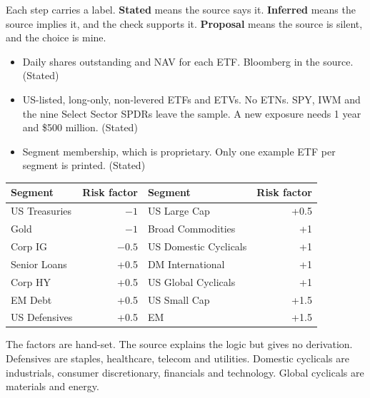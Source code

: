 \documentclass[11pt,a4paper]{article}
\newcommand{\sublabel}[1]{\par\vspace{3pt}\needspace{3\baselineskip}{\sffamily\small\bfseries #1}\par\nopagebreak[4]\vspace{1pt}}
\begin{document}
Each step carries a label. \textbf{Stated} means the source says it. \textbf{Inferred} means the source implies it, and the check supports it. \textbf{Proposal} means the source is silent, and the choice is mine.

\sublabel{Inputs}
\begin{itemize}
\item Daily shares outstanding and NAV for each ETF. Bloomberg in the source. (Stated)
\item US-listed, long-only, non-levered ETFs and ETVs. No ETNs. SPY, IWM and the nine Select Sector SPDRs leave the sample. A new exposure needs 1 year and \$500 million. (Stated)
\item Segment membership, which is proprietary. Only one example ETF per segment is printed. (Stated)
\end{itemize}

\begin{center}\small
\begin{tabular}{@{}lr|lr@{}}
\toprule
Segment & Risk factor & Segment & Risk factor \\
\midrule
US Treasuries & $-1$ & US Large Cap & +0.5 \\
Gold & $-1$ & Broad Commodities & +1 \\
Corp IG & $-0.5$ & US Domestic Cyclicals & +1 \\
Senior Loans & +0.5 & DM International & +1 \\
Corp HY & +0.5 & US Global Cyclicals & +1 \\
EM Debt & +0.5 & US Small Cap & +1.5 \\
US Defensives & +0.5 & EM & +1.5 \\
\bottomrule
\end{tabular}
\end{center}
The factors are hand-set. The source explains the logic but gives no derivation. Defensives are staples, healthcare, telecom and utilities. Domestic cyclicals are industrials, consumer discretionary, financials and technology. Global cyclicals are materials and energy.
\end{document}
